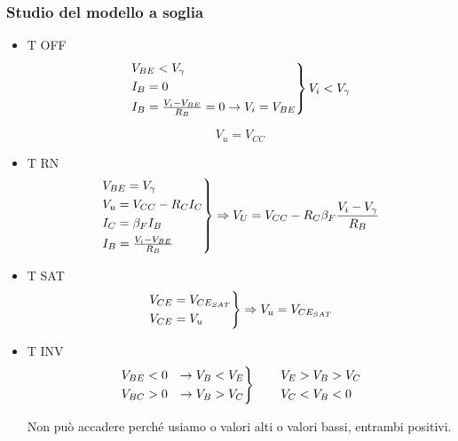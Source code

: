 \documentclass{article}
\begin{document}
\subsubsection*{Studio del modello a soglia}
\begin{itemize}
    \item T OFF
        \[
            \begin{rcases}
                V_{BE} < V_\gamma\\
                I_B = 0\\
                I_B = \frac{V_i - V_{BE}}{R_B} = 0 \rightarrow V_i = V_{BE}
            \end{rcases}
            V_i < V_\gamma
        \]

        \[ V_u = V_{CC} \]
    \item T RN
        \[
            \begin{rcases}
                V_{BE} = V_\gamma\\
                V_u = V_{CC} - R_C I_C\\
                I_C = \beta_F I_B\\
                I_B = \frac{V_i - V_{BE}}{R_B}
            \end{rcases} \Rightarrow V_U = V_{CC} - R_C \beta_F \frac{V_i - V_\gamma}{R_B}
        \]
    \item T SAT
        \[
            \begin{rcases}
                V_{CE} = V_{CE_{SAT}}\\
                V_{CE} = V_u
            \end{rcases} \Rightarrow V_u = V_{CE_{SAT}}
        \]
    \item T INV
        \[
            \begin{rcases}
                V_{BE} < 0 &\rightarrow V_B < V_E\\
                V_{BC} > 0 &\rightarrow V_B > V_C
            \end{rcases}\qquad
            \begin{aligned}
                V_E &> V_B > V_C\\
                V_C &< V_B < 0
            \end{aligned}
        \]

        Non può accadere perché usiamo o valori alti o valori bassi, entrambi positivi.
\end{itemize}
\end{document}
